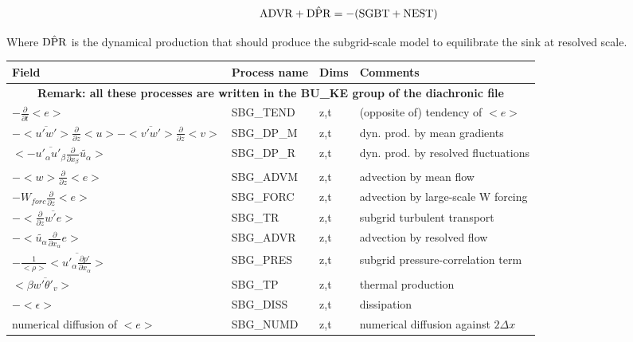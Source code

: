 \begin{displaymath}
{\rm ADVR}+\hat{\rm DPR} = -({\rm SGBT+NEST})
\end{displaymath}

Where $\hat{\rm DPR}$ is the dynamical production that should produce
the subgrid-scale model to equilibrate the sink at resolved scale.



\begingroup
\renewcommand\arraystretch{1.5}
\begin{longtable}[c]{|p{}|p{}|p{}|p{}|}
\hline
Field & Process name & Dims & Comments \\
\hline \hline
\endhead
\multicolumn{4}{|c|}{\textbf{Remark: all these processes are written in the BU\_KE group of the diachronic file}} \\
\hline
\endfoot
$-\frac{\partial }{\partial t}<e>$             & SBG\_TEND & z,t & (opposite of) tendency of $<e>$ \\\hline
$-<\overline{u'w'}>\frac{\partial }{\partial z}<u>-<\overline{v'w'}>\frac{\partial }{\partial z}<v>$ & SBG\_DP\_M & z,t & dyn. prod. by mean gradients \\\hline
$<-\overline{u'_\alpha u'_\beta}\frac{\partial}{\partial x_\beta}\tilde{u_\alpha}>$ & SBG\_DP\_R & z,t & dyn. prod. by resolved fluctuations \\\hline
$-<w>\frac{\partial}{\partial z}<e>$           & SBG\_ADVM & z,t & advection by mean flow\\\hline
$-W_{forc}\frac{\partial}{\partial z}<e>$      & SBG\_FORC & z,t & advection by large-scale W forcing\\\hline
$-<\frac{\partial}{\partial z}\overline{w'e}>$ & SBG\_TR   & z,t & subgrid turbulent transport\\\hline
$-<\tilde{u_\alpha}\frac{\partial}{\partial x_\alpha}e>$ & SBG\_ADVR & z,t & advection by resolved flow\\\hline
$- \frac{1}{<\rho>}<\overline{u'_\alpha \frac{\partial p'}{\partial x_\alpha}}>$& SBG\_PRES & z,t & subgrid pressure-correlation term\\\hline
$<\beta  \overline{w'\theta'_v}>$              & SBG\_TP   & z,t & thermal production \\\hline
$-<\epsilon>$                                  & SBG\_DISS & z,t & dissipation \\\hline
{\rm numerical diffusion of } $<e>$            & SBG\_NUMD & z,t & numerical diffusion against $2\Delta x$ \\\hline

\end{longtable}
